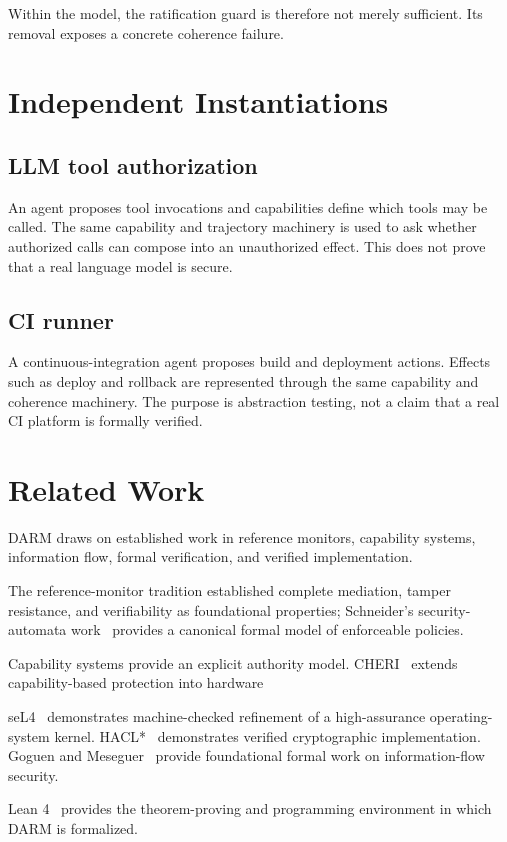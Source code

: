 \documentclass[11pt]{article}
\begin{document}
Within the model, the ratification guard is therefore not merely sufficient. Its removal exposes a concrete coherence failure.

\section{Independent Instantiations}
\subsection{LLM tool authorization}
An agent proposes tool invocations and capabilities define which tools may be called. The same capability and trajectory machinery is used to ask whether authorized calls can compose into an unauthorized effect. This does not prove that a real language model is secure.

\subsection{CI runner}
A continuous-integration agent proposes build and deployment actions. Effects such as deploy and rollback are represented through the same capability and coherence machinery. The purpose is abstraction testing, not a claim that a real CI platform is formally verified.

\section{Related Work}
DARM draws on established work in reference monitors, capability systems, information flow, formal verification, and verified implementation.

The reference-monitor tradition established complete mediation, tamper resistance, and verifiability as foundational properties; Schneider's security-automata work~\cite{schneider2000enforceable} provides a canonical formal model of enforceable policies.

Capability systems provide an explicit authority model. CHERI~\cite{watson2015cheri} extends capability-based protection into hardware

seL4~\cite{klein2009sel4} demonstrates machine-checked refinement of a high-assurance operating-system kernel. HACL*~\cite{zinzindohoue2017haclstar} demonstrates verified cryptographic implementation. Goguen and Meseguer~\cite{goguen1982security} provide foundational formal work on information-flow security.

Lean 4~\cite{demoura2021lean4} provides the theorem-proving and programming environment in which DARM is formalized.
\end{document}

